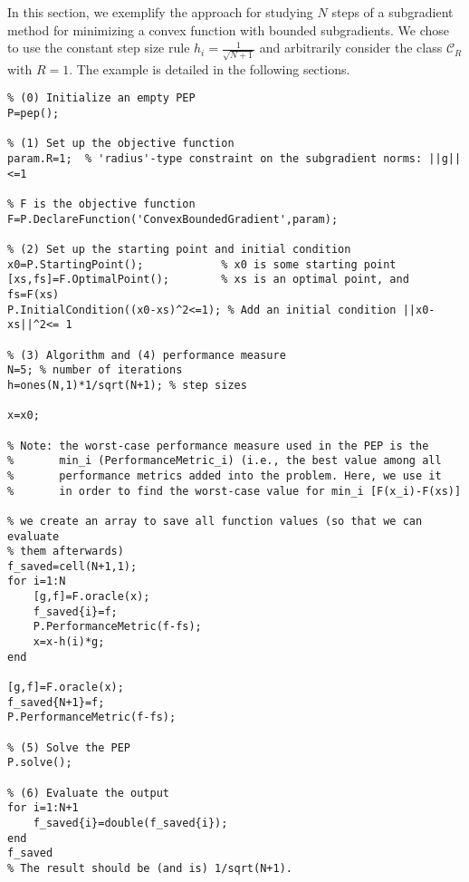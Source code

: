 \documentclass[11pt,a4paper]{article}
\begin{document}
In this section, we exemplify the approach for studying $N$ steps of a subgradient method for minimizing a convex function with bounded subgradients. We chose to use the constant step size rule $h_i=\frac{1}{\sqrt{N+1}}$ and arbitrarily consider the class $\mathcal{C}_R$ with $R=1$. The example is detailed in the following sections.
\begin{lstlisting}
% (0) Initialize an empty PEP
P=pep();

% (1) Set up the objective function
param.R=1;	% 'radius'-type constraint on the subgradient norms: ||g||<=1

% F is the objective function
F=P.DeclareFunction('ConvexBoundedGradient',param); 

% (2) Set up the starting point and initial condition
x0=P.StartingPoint();            % x0 is some starting point
[xs,fs]=F.OptimalPoint();        % xs is an optimal point, and fs=F(xs)
P.InitialCondition((x0-xs)^2<=1); % Add an initial condition ||x0-xs||^2<= 1

% (3) Algorithm and (4) performance measure
N=5; % number of iterations
h=ones(N,1)*1/sqrt(N+1); % step sizes

x=x0;

% Note: the worst-case performance measure used in the PEP is the 
%       min_i (PerformanceMetric_i) (i.e., the best value among all
%       performance metrics added into the problem. Here, we use it
%       in order to find the worst-case value for min_i [F(x_i)-F(xs)]

% we create an array to save all function values (so that we can evaluate
% them afterwards)
f_saved=cell(N+1,1);
for i=1:N
    [g,f]=F.oracle(x);
    f_saved{i}=f;
    P.PerformanceMetric(f-fs);
    x=x-h(i)*g;
end

[g,f]=F.oracle(x);
f_saved{N+1}=f;
P.PerformanceMetric(f-fs);

% (5) Solve the PEP
P.solve();

% (6) Evaluate the output
for i=1:N+1
    f_saved{i}=double(f_saved{i});
end
f_saved
% The result should be (and is) 1/sqrt(N+1).
\end{lstlisting}
\newpage
\end{document}

